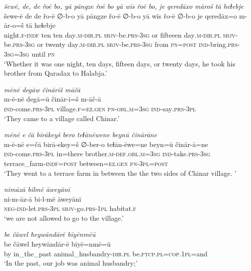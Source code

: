 \ea \label{DG.29}
\textit{šewē, de, de řoē bo, yā pāngze řoē bo yā wīs řoē bo, je qeredāxo māroš tā heɫebje} \\ 
\gll šewe-ē de de řo-ē ∅-b-o yā pāngze řo-ē ∅-b-o yā wīs řo-ē ∅-b-o je qeredāx=o m-ār-o=š tā heɫebje \\ 
 night\textsc{\textsc{.f}}\textsc{-indf} ten ten day\textsc{.m}\textsc{-dir}\textsc{.pl} \textsc{sbjv-}be\textsc{.prs}\textsc{-3sg} or fifteeen day\textsc{.m}\textsc{-dir}\textsc{.pl} \textsc{sbjv-}be\textsc{.prs}\textsc{-3sg} or twenty day\textsc{.m}\textsc{-dir}\textsc{.pl} \textsc{sbjv-}be\textsc{.prs}\textsc{-3sg} from \textsc{pn}\textsc{=\textsc{post}} \textsc{ind-}bring\textsc{.prs}\textsc{-3sg}\textsc{=3sg} until \textsc{pn} \\ 
\glt `Whether it was one night, ten days, fifteen days, or twenty days, he took his brother from Qaradax to Halabja.'
\z 
 
\ea \label{DG.30}
\textit{mēnē degāw činārīš māčā} \\ 
\gll m-ē-nē degā=ū činār-ī=š m-āč-ā \\ 
 \textsc{ind-}come\textsc{.prs}\textsc{-3pl} village\textsc{\textsc{.f}}\textsc{=ez}\textsc{.gen} \textsc{pn}\textsc{-obl}\textsc{.m}\textsc{=3sg} \textsc{ind-}say\textsc{.prs}\textsc{-3pl} \\ 
\glt `They came to a village called Chinar.'
\z 
 
\ea \label{DG.31}
\textit{mēnē e čā birākeyš bero teɫānēwene beynū činārāne} \\ 
\gll m-ē-nē e=čā birā-ekey=š ∅-ber-o teɫān-ēwe=ne beyn=ū činār-ā=ne \\ 
 \textsc{ind-}come\textsc{.prs}\textsc{-3pl} in=there brother\textsc{.m}\textsc{-def}\textsc{.obl}\textsc{.m}\textsc{=3sg} \textsc{ind-}take\textsc{.prs}\textsc{-3sg} terrace\_farm\textsc{-indf}\textsc{=\textsc{post}} between\textsc{=ez}\textsc{.gen} \textsc{pn}\textsc{-3pl}\textsc{=\textsc{post}} \\ 
\glt `They went to a terrace farm in between the the two sides of Chinar village. '
\z 
 
\ea \label{DG.35}
\textit{nimāzā bilmē āweyānī} \\ 
\gll ni-m-āz-ā bi-l-mē āweyānī \\ 
 \textsc{neg-}\textsc{ind-}let\textsc{.prs}\textsc{-3pl} \textsc{sbjv-}go\textsc{.prs}\textsc{-1pl} habitat\textsc{\textsc{.f}} \\ 
\glt `we are not allowed to go to the village.'
\z 
 
\ea \label{DG.36}
\textit{be čāwel ħeywāndārē bīyēnmēū} \\ 
\gll be čāwel ħeywāndār-ē bīyē=nmē=ū \\ 
 by in\_the\_past animal\_husbandry\textsc{-dir}\textsc{.pl} be\textsc{.ptcp}\textsc{.pl}\textsc{=cop}\textsc{.1pl}=and \\ 
\glt `In the past, our job was animal husbandry;'
\z 
 
